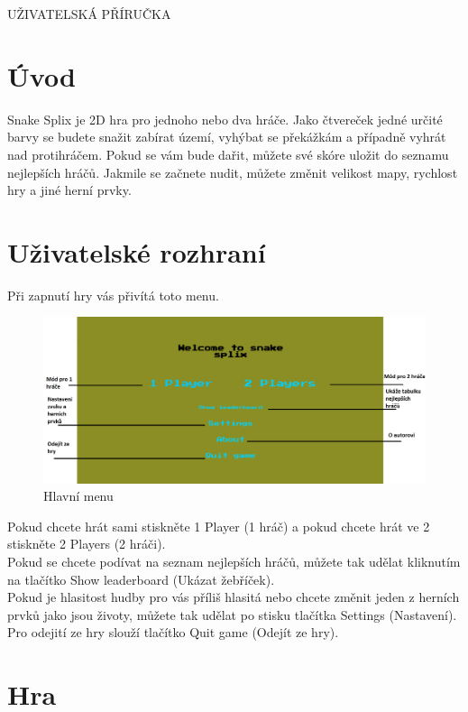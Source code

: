 \documentclass[12pt,a4paper]{report}
\begin{document}
\vspace*{\fill}
{\sffamily\bfseries
    \begin{center}
        {\fontsize{24}{28}\selectfont UŽIVATELSKÁ PŘÍRUČKA}
    \end{center}
}
\vspace*{\fill}
\chapter{Úvod}
Snake Splix je 2D hra pro jednoho nebo dva hráče.
Jako čtvereček jedné určité barvy se budete snažit zabírat území, vyhýbat se překážkám a případně vyhrát nad protihráčem.
Pokud se vám bude dařit, můžete své skóre uložit do seznamu nejlepších hráčů.
Jakmile se začnete nudit, můžete změnit velikost mapy, rychlost hry a jiné herní prvky.
\par
{\let\clearpage\relax 
\chapter{Uživatelské rozhraní}}
Při zapnutí hry vás přivítá toto menu.
\begin{figure}[H]\centering
    \includegraphics[width=\textwidth]{images/main_menu_desc.png}
    \caption{Hlavní menu}
\end{figure}
Pokud chcete hrát sami stiskněte 1 Player (1 hráč) a pokud chcete hrát ve 2 stiskněte 2 Players (2 hráči). \\
Pokud se chcete podívat na seznam nejlepších hráčů, můžete tak udělat kliknutím na tlačítko Show leaderboard (Ukázat žebříček). \\
Pokud je hlasitost hudby pro vás příliš hlasitá nebo chcete změnit jeden z herních prvků jako jsou životy, můžete tak udělat po stisku tlačítka Settings (Nastavení). \\
Pro odejití ze hry slouží tlačítko Quit game (Odejít ze hry).
\chapter{Hra}
\end{document}
